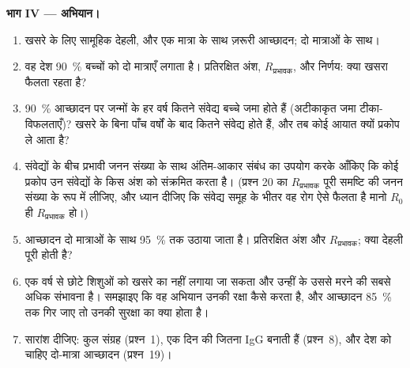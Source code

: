 \begin{problem}
\medskip
\noindent\textbf{भाग IV --- अभियान।}
\begin{enumerate}[resume]
  \item खसरे के लिए सामूहिक देहली, और एक मात्रा के साथ ज़रूरी आच्छादन;
        दो मात्राओं के साथ।
  \item वह देश \qty{90}{\%} बच्चों को दो मात्राएँ लगाता है। प्रतिरक्षित
        अंश, $R_{\text{प्रभावक}}$, और निर्णय: क्या खसरा फैलता रहता है?
  \item \qty{90}{\%} आच्छादन पर जन्मों के हर वर्ष कितने संवेद्य बच्चे
        जमा होते हैं (अटीकाकृत जमा टीका-विफलताएँ)? खसरे के बिना पाँच
        वर्षों के बाद कितने संवेद्य होते हैं, और तब कोई आयात क्यों
        प्रकोप ले आता है?
  \item संवेद्यों के बीच प्रभावी जनन संख्या के साथ अंतिम-आकार संबंध का
        उपयोग करके आँकिए कि कोई प्रकोप उन संवेद्यों के किस अंश को
        संक्रमित करता है। (प्रश्न 20 का $R_{\text{प्रभावक}}$ पूरी समष्टि
        की जनन संख्या के रूप में लीजिए, और ध्यान दीजिए कि संवेद्य समूह
        के भीतर वह रोग ऐसे फैलता है मानो $R_{0}$ ही $R_{\text{प्रभावक}}$
        हो।)
  \item आच्छादन दो मात्राओं के साथ \qty{95}{\%} तक उठाया जाता है।
        प्रतिरक्षित अंश और $R_{\text{प्रभावक}}$; क्या देहली पूरी होती है?
  \item एक वर्ष से छोटे शिशुओं को खसरे का  नहीं लगाया जा सकता और
        उन्हीं के उससे मरने की सबसे अधिक संभावना है। समझाइए कि वह
        अभियान उनकी रक्षा कैसे करता है, और आच्छादन \qty{85}{\%} तक गिर
        जाए तो उनकी सुरक्षा का क्या होता है।
  \item सारांश दीजिए: कुल संग्रह (प्रश्न~1), एक दिन की  जितना IgG बनाती हैं (प्रश्न~8), और देश को चाहिए
        दो-मात्रा आच्छादन (प्रश्न~19)।
\end{enumerate}
\end{problem}
